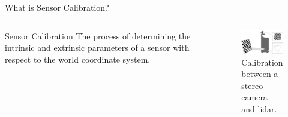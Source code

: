 \documentclass{beamer}
\newcommand\Fontsmall{\fontsize{6}{5}\selectfont}
\begin{document}
\begin{frame}{What is Sensor Calibration?}
    \begin{columns}[T]  
        \begin{column}{.4\textwidth}
        \begin{block}{Sensor Calibration}
            The process of determining the \alert{intrinsic} and \alert{extrinsic} parameters of a sensor with respect to the world coordinate system.
        \end{block}
        \end{column}
        \begin{column}{.5\textwidth}
            \begin{figure}
                \includegraphics[width=.92\textwidth]{Images/camera-laser-calibration.png}
                \caption{Calibration between a stereo camera and lidar. \Fontsmall{Image: Copyright Robert Pless.}}
            \end{figure}
        \end{column}
  \end{columns} 
\end{frame}
\end{document}
